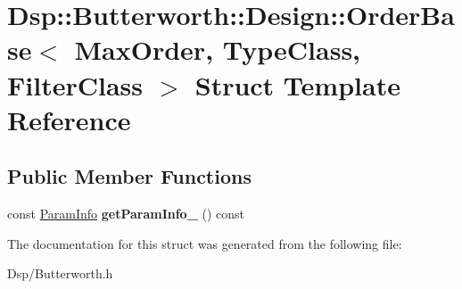 \hypertarget{structDsp_1_1Butterworth_1_1Design_1_1OrderBase}{\section{Dsp\-:\-:Butterworth\-:\-:Design\-:\-:Order\-Base$<$ Max\-Order, Type\-Class, Filter\-Class $>$ Struct Template Reference}
\label{structDsp_1_1Butterworth_1_1Design_1_1OrderBase}
}
\subsection*{Public Member Functions}
\begin{DoxyCompactItemize}
\item 
\hypertarget{structDsp_1_1Butterworth_1_1Design_1_1OrderBase_ab57b19d410910d04fc42973409e1caf3}{const \hyperlink{classDsp_1_1ParamInfo}{Param\-Info} {\bfseries get\-Param\-Info\-\_} () const }\label{structDsp_1_1Butterworth_1_1Design_1_1OrderBase_ab57b19d410910d04fc42973409e1caf3}

\end{DoxyCompactItemize}


The documentation for this struct was generated from the following file\-:\begin{DoxyCompactItemize}
\item 
Dsp/Butterworth.\-h\end{DoxyCompactItemize}
